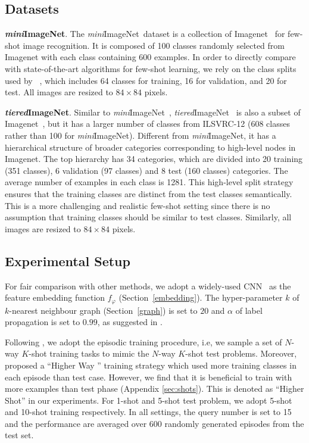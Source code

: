 \documentclass{article} \usepackage{iclr2019_conference,times}
\def\mini{{\textit{mini}ImageNet}}
\def\tiered{{\textit{tiered}ImageNet}}
\begin{document}
\subsection{Datasets}
\textbf{\mini}. The \mini~dataset is a collection of Imagenet~\citep{imagenet} for few-shot image recognition. It is composed of 100 classes randomly selected from Imagenet with each class containing 600 examples. In order to directly compare with state-of-the-art algorithms for few-shot learning, we rely on the class splits used by ~\cite{metaLSTM}, which includes 64 classes for training, 16 for validation, and 20 for test. All images are resized to $84\times 84$ pixels.

\textbf{\tiered}. Similar to \mini~, \tiered~\citep{semi-proto} is also a subset of Imagenet~\citep{imagenet}, but it has a larger number of classes from ILSVRC-12 (608 classes rather than 100 for \mini). Different from \mini, it has a hierarchical structure of broader categories corresponding to high-level nodes in Imagenet. The top hierarchy has 34 categories, which are divided into 20 training (351 classes), 6 validation (97 classes) and 8 test (160 classes) categories. 
The average number of examples in each class is 1281.
This high-level split strategy ensures that the training classes are distinct from the test classes semantically. This is a more challenging and realistic few-shot setting since there is no assumption that training classes should be similar to test classes. Similarly, all images are resized to $84\times 84$ pixels.

\subsection{Experimental Setup}
For fair comparison with other methods, we adopt a widely-used CNN~\citep{maml,prototypical} as the feature embedding function $f_{\varphi}$ (Section~\ref{embedding}). 
The hyper-parameter $k$ of $k$-nearest neighbour graph (Section~\ref{graph}) is set to $20$ and $\alpha$ of label propagation is set to $0.99$, as suggested in \cite{labelprop1}.


Following \cite{prototypical}, we adopt the episodic training procedure, i.e, we sample a set of $N$-way $K$-shot training tasks to mimic the $N$-way $K$-shot test problems. Moreover, \cite{prototypical} proposed a ``Higher Way '' training strategy which used more training classes in each episode than test case. However, we find that it is beneficial to train with more examples than test phase (Appendix \ref{sec:shots}). This is denoted as ``Higher Shot'' in our experiments. For 1-shot and 5-shot test problem, we adopt 5-shot and 10-shot training respectively. In all settings, the query number is set to 15 and the performance are averaged over 600 randomly generated episodes from the test set. 
\end{document}
